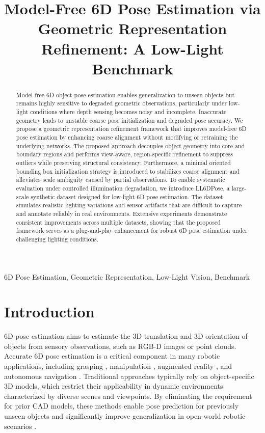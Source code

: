 \documentclass[letterpaper, 10 pt, journal, twoside]{IEEEtran}  %
\title{Model-Free 6D Pose Estimation via Geometric Representation Refinement: A Low-Light Benchmark}
\begin{document}
		
	\maketitle	
	\begin{abstract}
	
Model-free 6D object pose estimation enables generalization to unseen objects but remains highly sensitive to degraded geometric observations, particularly under low-light conditions where depth sensing becomes noisy and incomplete. Inaccurate geometry leads to unstable coarse pose initialization and degraded pose accuracy.
We propose a geometric representation refinement framework that improves model-free 6D pose estimation by enhancing coarse alignment without modifying or retraining the underlying networks. The proposed approach decouples object geometry into core and boundary regions and performs view-aware, region-specific refinement to suppress outliers while preserving structural consistency. Furthermore, a minimal oriented bounding box initialization strategy is introduced to  stabilizes coarse alignment and alleviates scale ambiguity caused by partial observations.
To enable systematic evaluation under controlled illumination degradation, we introduce LL6DPose, a large-scale synthetic dataset designed for low-light 6D pose estimation. The dataset simulates realistic lighting variations and sensor artifacts that are difficult to capture and annotate reliably in real environments. Extensive experiments demonstrate consistent improvements across multiple datasets, showing that the proposed framework serves as a plug-and-play enhancement for robust 6D pose estimation under challenging lighting conditions.

\end{abstract}
	\begin{IEEEkeywords}
	6D Pose Estimation, Geometric Representation, Low-Light Vision, Benchmark
	\end{IEEEkeywords}

\IEEEpeerreviewmaketitle
  \section{Introduction}


 6D pose estimation aims to estimate the 3D translation and 3D orientation of objects from sensory observations, such as RGB-D images or point clouds. Accurate 6D pose estimation is a critical component in many robotic applications, including grasping \cite{gumeli2023objectmatch}, manipulation \cite{an2024rgbmanip}, augmented reality \cite{wang2024nerfs}, and autonomous navigation \cite{zou2021end}. Traditional approaches typically rely on object-specific 3D models, which restrict their applicability in dynamic environments characterized by diverse scenes and viewpoints. By eliminating the requirement for prior CAD models, these methods enable pose prediction for previously unseen objects and significantly improve generalization in open-world robotic scenarios \cite{he2022fs6d}.
\end{document}
